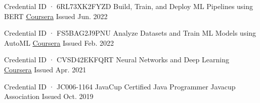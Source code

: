 

\begin{cventries}

  \cventry%
    {\upshape Credential ID · 6RL73XK2FYZD} %
    {Build, Train, and Deploy ML Pipelines using BERT} %
    {\href{https://coursera.org/share/070aeca0fe35f95d6dd490b63683a7bd}{\underline{Coursera}}} %
    {Issued Jun. 2022} %
    {}

  \cventry%
    {\upshape Credential ID · FS5BAG2J9PNU} %
    {Analyze Datasets and Train ML Models using AutoML} %
    {\href{https://coursera.org/share/15e8f50205461ac49b73f692a4c2cb69}{\underline{Coursera}}} %
    {Issued Feb. 2022} %
    {}

  \cventry%
    {\upshape Credential ID · CVSD42EKFQRT} %
    {Neural Networks and Deep Learning} %
    {\href{https://coursera.org/share/15e1ccfd8eebaf82362e2757bdf2a860}{\underline{Coursera}}} %
    {Issued Apr. 2021} %
    {}

  \cventry%
    {\upshape Credential ID · JC006-1164} %
    {JavaCup Certified Java Programmer} %
    {Javacup Association} %
    {Issued Oct. 2019} %
    {}


\end{cventries}
